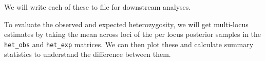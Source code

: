 \documentclass[]{article}
\newenvironment{Shaded}{\begin{snugshade}}{\end{snugshade}}
\newcommand{\KeywordTok}[1]{\textcolor[rgb]{0.13,0.29,0.53}{\textbf{{#1}}}}
\newcommand{\DataTypeTok}[1]{\textcolor[rgb]{0.13,0.29,0.53}{{#1}}}
\newcommand{\StringTok}[1]{\textcolor[rgb]{0.31,0.60,0.02}{{#1}}}
\newcommand{\ErrorTok}[1]{\textbf{{#1}}}
\newcommand{\NormalTok}[1]{{#1}}
\begin{document}
We will write each of these to file for downstream analyses.

\begin{Shaded}
\end{Shaded}

To evaluate the observed and expected heterozygosity, we will get
multi-locus estimates by taking the mean across loci of the per locus
posterior samples in the \texttt{het\_obs} and \texttt{het\_exp}
matrices. We can then plot these and calculate summary statistics to
understand the difference between them.
\end{document}
